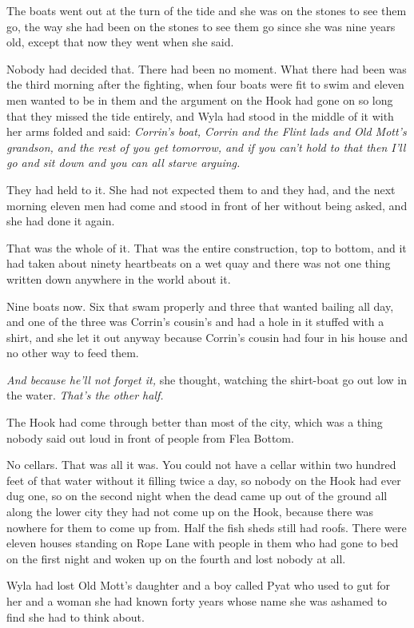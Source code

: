 The boats went out at the turn of the tide and she was on the stones to see them go, the way she had been on the stones to see them go since she was nine years old, except that now they went when she said.

Nobody had decided that. There had been no moment. What there had been was the third morning after the fighting, when four boats were fit to swim and eleven men wanted to be in them and the argument on the Hook had gone on so long that they missed the tide entirely, and Wyla had stood in the middle of it with her arms folded and said: \textit{Corrin’s boat, Corrin and the Flint lads and Old Mott’s grandson, and the rest of you get tomorrow, and if you can’t hold to that then I’ll go and sit down and you can all starve arguing.}

They had held to it. She had not expected them to and they had, and the next morning eleven men had come and stood in front of her without being asked, and she had done it again.

That was the whole of it. That was the entire construction, top to bottom, and it had taken about ninety heartbeats on a wet quay and there was not one thing written down anywhere in the world about it.

Nine boats now. Six that swam properly and three that wanted bailing all day, and one of the three was Corrin’s cousin’s and had a hole in it stuffed with a shirt, and she let it out anyway because Corrin’s cousin had four in his house and no other way to feed them.

\textit{And because he’ll not forget it,} she thought, watching the shirt-boat go out low in the water. \textit{That’s the other half.}

\sceneBreak

The Hook had come through better than most of the city, which was a thing nobody said out loud in front of people from Flea Bottom.

No cellars. That was all it was. You could not have a cellar within two hundred feet of that water without it filling twice a day, so nobody on the Hook had ever dug one, so on the second night when the dead came up out of the ground all along the lower city they had not come up on the Hook, because there was nowhere for them to come up from. Half the fish sheds still had roofs. There were eleven houses standing on Rope Lane with people in them who had gone to bed on the first night and woken up on the fourth and lost nobody at all.

Wyla had lost Old Mott’s daughter and a boy called Pyat who used to gut for her and a woman she had known forty years whose name she was ashamed to find she had to think about.

